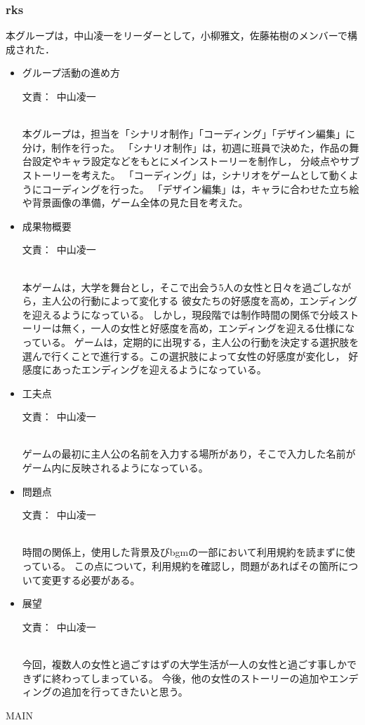 \documentclass[a4paper]{jarticle}
\newcommand{\resp}[1]{\begin{flushright}文責：~#1\end{flushright}~\\}
\begin{document}
\fi

\subsubsection{rks}
    
    本グループは，中山凌一をリーダーとして，小柳雅文，佐藤祐樹のメンバーで構成された．

    \begin{itemize}
        \item グループ活動の進め方
        
        \resp{中山凌一}

        本グループは，担当を「シナリオ制作」「コーディング」「デザイン編集」に分け，制作を行った。
        「シナリオ制作」は，初週に班員で決めた，作品の舞台設定やキャラ設定などをもとにメインストーリーを制作し，
        分岐点やサブストーリーを考えた。
        「コーディング」は，シナリオをゲームとして動くようにコーディングを行った。
        「デザイン編集」は，キャラに合わせた立ち絵や背景画像の準備，ゲーム全体の見た目を考えた。

        \item 成果物概要
        
        \resp{中山凌一}

        本ゲームは，大学を舞台とし，そこで出会う5人の女性と日々を過ごしながら，主人公の行動によって変化する
        彼女たちの好感度を高め，エンディングを迎えるようになっている。
        しかし，現段階では制作時間の関係で分岐ストーリーは無く，一人の女性と好感度を高め，エンディングを迎える仕様になっている。
        ゲームは，定期的に出現する，主人公の行動を決定する選択肢を選んで行くことで進行する。この選択肢によって女性の好感度が変化し，
        好感度にあったエンディングを迎えるようになっている。

        \item 工夫点
        
        \resp{中山凌一}

        ゲームの最初に主人公の名前を入力する場所があり，そこで入力した名前がゲーム内に反映されるようになっている。

        \item 問題点
        
        \resp{中山凌一}

        時間の関係上，使用した背景及びbgmの一部において利用規約を読まずに使っている。
        この点について，利用規約を確認し，問題があればその箇所について変更する必要がある。

        \item 展望
        
        \resp{中山凌一}

        今回，複数人の女性と過ごすはずの大学生活が一人の女性と過ごす事しかできずに終わってしまっている。
        今後，他の女性のストーリーの追加やエンディングの追加を行ってきたいと思う。

    \end{itemize}

\expandafter\ifx\csname MAIN \endcsname\relax
  
\end{document}
